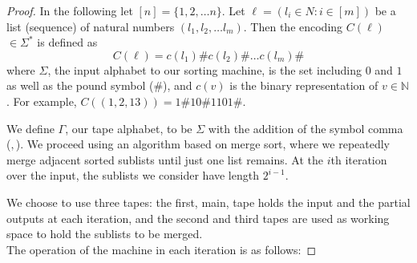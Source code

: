 \documentclass[english]{article}
\theoremstyle{plain}
\theoremstyle{definition}
\theoremstyle{plain}
\begin{document}
\begin{proof}
  In the following let $[n] = \{1,2,\ldots n\}$. Let $\ell = (l_i \in
  N: i \in [m])$ be a list (sequence) of natural numbers $(l_1,l_2,
  \ldots l_m)$. Then the encoding $C(\ell)$ $\in \Sigma^*$ is defined
  as
\[
C(\ell) = c(l_1) \# c(l_2) \# \ldots c(l_m) \#
\]
  where $\Sigma$, the input alphabet to our sorting machine, is the
  set including $0$ and $1$ as well as the pound symbol ($\#$), and
  $c(v)$ is the binary representation of $v \in \mathbb{N}$. For
  example, $C((1,2,13))=1\#10\#1101\#$.

  We define $\Gamma$, our tape alphabet, to be $\Sigma$ with the
  addition of the symbol comma ($,$). We proceed using an algorithm
  based on merge sort, where we repeatedly merge adjacent sorted
  sublists until just one list remains. At the $i$th iteration over
  the input, the sublists we consider have length $2^{i-1}$.

  We choose to use three tapes: the first, main, tape holds the input
  and the partial outputs at each iteration, and the second and third
  tapes are used as working space to hold the sublists to be merged. \\

  The operation of the machine in each iteration is as follows:


\end{proof}
\end{document}
